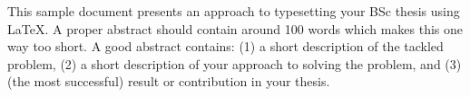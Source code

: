 This sample document presents an approach to typesetting your BSc thesis using
\LaTeX. A proper abstract should contain around 100 words which makes this one
way too short. A good abstract contains: (1) a short description of the
tackled problem, (2) a short description of your approach to solving the
problem, and (3) (the most successful) result or contribution in your thesis.
